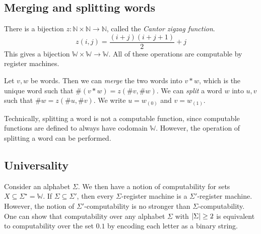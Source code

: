 \subsection{Merging and splitting words}
There is a bijection \( z \colon \mathbb N \times \mathbb N \to \mathbb N \), called the \emph{Cantor zigzag function}.
\[ z(i,j) = \frac{(i+j)(i+j+1)}{2} + j \]
This gives a bijection \( \mathbb W \times \mathbb W \to \mathbb W \).
All of these operations are computable by register machines.
\begin{definition}
	Let \( v, w \) be words.
	Then we can \emph{merge} the two words into \( v \ast w \), which is the unique word such that \( \#(v \ast w) = z(\#v, \#w) \).
	We can \emph{split} a word \( w \) into \( u, v \) such that \( \#w = z(\#u, \#v) \).
	We write \( u = w_{(0)} \) and \( v = w_{(1)} \).
\end{definition}
Technically, splitting a word is not a computable function, since computable functions are defined to always have codomain \( \mathbb W \).
However, the operation of splitting a word can be performed.

\subsection{Universality}
Consider an alphabet \( \Sigma \).
We then have a notion of computability for sets \( X \subseteq \Sigma^\star = \mathbb W \).
If \( \Sigma \subseteq \Sigma' \), then every \( \Sigma \)-register machine is a \( \Sigma' \)-register machine.
However, the notion of \( \Sigma' \)-computability is no stronger than \( \Sigma \)-computability.
One can show that computability over any alphabet \( \Sigma \) with \( \abs{\Sigma} \geq 2 \) is equivalent to computability over the set \( \qty{0,1} \) by encoding each letter as a binary string.

